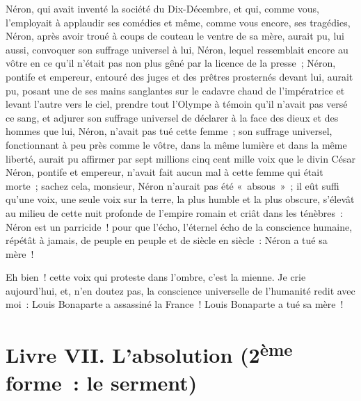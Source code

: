 \documentclass[french,twoside]{book} %
\begin{document}
Néron, qui avait inventé la société du Dix-Décembre, et qui, comme vous, l’employait à applaudir ses comédies et même, comme vous encore, ses tragédies, Néron, après avoir troué à coups de couteau le ventre de sa mère, aurait pu, lui aussi, convoquer son suffrage universel à lui, Néron, lequel ressemblait encore au vôtre en ce qu’il n’était pas non plus gêné par la licence de la presse ; Néron, pontife et empereur, entouré des juges et des prêtres prosternés devant lui, aurait pu, posant une de ses mains sanglantes sur le cadavre chaud de l’impératrice et levant l’autre vers le ciel, prendre tout l’Olympe à témoin qu’il n’avait pas versé ce sang, et adjurer son suffrage universel de déclarer à la face des dieux et des hommes que lui, Néron, n’avait pas tué cette femme ; son suffrage universel, fonctionnant à peu près comme le vôtre, dans la même lumière et dans la même liberté, aurait pu affirmer par sept millions cinq cent mille voix que le divin César Néron, pontife et empereur, n’avait fait aucun mal à cette femme qui était morte ; sachez cela, monsieur, Néron n’aurait pas été « absous » ; il eût suffi qu’une voix, une seule voix sur la terre, la plus humble et la plus obscure, s’élevât au milieu de cette nuit profonde de l’empire romain et criât dans les ténèbres : Néron est un parricide ! pour que l’écho, l’éternel écho de la conscience humaine, répétât à jamais, de peuple en peuple et de siècle en siècle : Néron a tué sa mère !\par
Eh bien ! cette voix qui proteste dans l’ombre, c’est la mienne. Je crie aujourd’hui, et, n’en doutez pas, la conscience universelle de l’humanité redit avec moi : Louis Bonaparte a assassiné la France ! Louis Bonaparte a tué sa mère !
\section[{Livre VII. L’absolution (2ème forme : le serment)}]{Livre VII. L’absolution (2\textsuperscript{ème} forme : le serment)}\renewcommand{\leftmark}{Livre VII. L’absolution (2\textsuperscript{ème} forme : le serment)}
\end{document}
